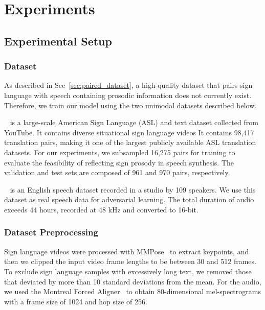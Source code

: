 \section{Experiments}
\label{sec:experiments}

\subsection{Experimental Setup}

\subsubsection{Dataset}
\label{subsec:datasets}
As described in Sec~\ref{sec:paired_dataset}, a high-quality dataset that pairs sign language with speech containing prosodic information does not currently exist. Therefore, we train our model using the two unimodal datasets described below.

~\cite{shi-etal-2022-open} is a large-scale American Sign Language (ASL) and text dataset collected from YouTube.
It contains diverse situational sign language videos It contains 98,417 translation pairs,
making it one of the largest publicly available ASL translation datasets. 
For our experiments, we subsampled 16,275 pairs for training to evaluate the feasibility of reflecting sign prosody in speech synthesis.
The validation and test sets are composed of 961 and 970 pairs, respectively.

~\cite{VCTK} is an English speech dataset recorded in a studio by 109 speakers. 
We use this dataset as real speech data for adversarial learning.
The total duration of audio exceeds 44 hours, recorded at 48 kHz and converted to 16-bit.

\vspace{-2mm}
\subsubsection{Dataset Preprocessing}
Sign language videos were processed with MMPose~\cite{mmpose} to extract keypoints, and then we clipped the input video frame lengths to be between 30 and 512 frames. To exclude sign language samples with excessively long text, we removed those that deviated by more than 10 standard deviations from the mean.
For the audio, we used the Montreal Forced Aligner~\cite{mfa} to obtain 80-dimensional mel-spectrograms with a frame size of 1024 and hop size of 256.

